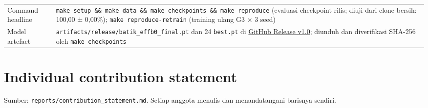\documentclass[10pt,a4paper]{article}
\begin{document}
{\begin{longtable}[]{@{}
  >{\raggedright\arraybackslash}p{}
  >{\raggedright\arraybackslash}p{}@{}}
Command headline & \texttt{make\ setup\ \&\&\ make\ data\ \&\&\ make\ checkpoints\ \&\&\ make\ reproduce} (evaluasi checkpoint rilis; diuji dari clone bersih: 100,00 ± 0,00\%); \texttt{make\ reproduce-retrain} (training ulang G3 × 3 seed) \\
Model artefact & \texttt{artifacts/\allowbreak{}release/\allowbreak{}batik\_\allowbreak{}effb0\_\allowbreak{}final.pt} dan 24 \texttt{best.pt} di \href{https://github.com/Universitas-Cakrawala/semarang-batik-fine-grained-transfer-learning/releases/tag/v1.0}{GitHub Release v1.0}; diunduh dan diverifikasi SHA-256 oleh \texttt{make\ checkpoints} \\
\end{longtable}
}

\section{Individual contribution statement}\label{individual-contribution-statement}

Sumber: \texttt{reports/\allowbreak{}contribution\_\allowbreak{}statement.md}. Setiap anggota menulis dan menandatangani barisnya sendiri.
\end{document}
